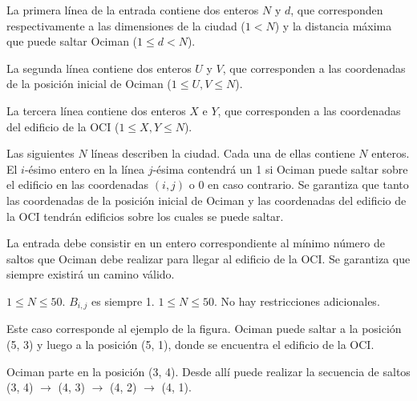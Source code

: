 \documentclass{oci}
\begin{document}
\begin{inputDescription}
La primera línea de la entrada contiene dos enteros $N$ y $d$, que corresponden
respectivamente a las dimensiones de la ciudad ($1 < N$) y la distancia máxima
que puede saltar Ociman ($1 \le d < N$).

La segunda línea contiene dos enteros $U$ y $V$, que corresponden a las
coordenadas de la posición inicial de Ociman ($1 \le U, V \le N$).

La tercera línea contiene dos enteros $X$ e $Y$, que corresponden a las
coordenadas del edificio de la OCI ($1 \le X, Y \le N$).

Las siguientes $N$ líneas describen la ciudad.
Cada una de ellas contiene $N$ enteros.
El $i$-ésimo entero en la línea $j$-ésima contendrá un 1 si Ociman puede saltar
sobre el edificio en las coordenadas $(i, j)$ o 0 en caso contrario.
Se garantiza que tanto las coordenadas de la posición inicial de Ociman y las
coordenadas del edificio de la OCI tendrán edificios sobre los cuales se
puede saltar.
\end{inputDescription}

\begin{outputDescription}
La entrada debe consistir en un entero correspondiente al mínimo número de saltos
que Ociman debe realizar para llegar al edificio de la OCI.
Se garantiza que siempre existirá un camino válido.
\end{outputDescription}

\begin{scoreDescription}
   $1 \le N \le 50$. $B_{i,j}$ es siempre 1.
   $1 \le N \le 50$. No hay restricciones adicionales.
\end{scoreDescription}

\begin{sampleDescription}
Este caso corresponde al ejemplo de la figura.
Ociman puede saltar a la posición (5, 3) y luego a la posición (5, 1), donde se encuentra el edificio de la OCI.

Ociman parte en la posición (3, 4).
Desde allí puede realizar la secuencia de saltos (3, 4) $\rightarrow$ (4, 3) $\rightarrow$ (4, 2) $\rightarrow$ (4, 1).

\end{sampleDescription}
\end{document}
